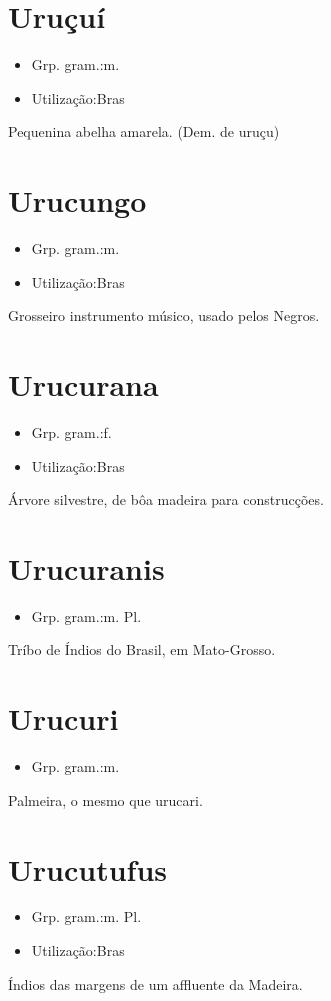 \documentclass{article}
\begin{document}
\section{Uruçuí}
\begin{itemize}
\item {Grp. gram.:m.}
\end{itemize}
\begin{itemize}
\item {Utilização:Bras}
\end{itemize}
Pequenina abelha amarela.
(Dem. de \textunderscore uruçu\textunderscore )
\section{Urucungo}
\begin{itemize}
\item {Grp. gram.:m.}
\end{itemize}
\begin{itemize}
\item {Utilização:Bras}
\end{itemize}
Grosseiro instrumento músico, usado pelos Negros.
\section{Urucurana}
\begin{itemize}
\item {Grp. gram.:f.}
\end{itemize}
\begin{itemize}
\item {Utilização:Bras}
\end{itemize}
Árvore silvestre, de bôa madeira para construcções.
\section{Urucuranis}
\begin{itemize}
\item {Grp. gram.:m. Pl.}
\end{itemize}
Tríbo de Índios do Brasil, em Mato-Grosso.
\section{Urucuri}
\begin{itemize}
\item {Grp. gram.:m.}
\end{itemize}
Palmeira, o mesmo que \textunderscore urucari\textunderscore .
\section{Urucutufus}
\begin{itemize}
\item {Grp. gram.:m. Pl.}
\end{itemize}
\begin{itemize}
\item {Utilização:Bras}
\end{itemize}
Índios das margens de um affluente da Madeira.
\end{document}
